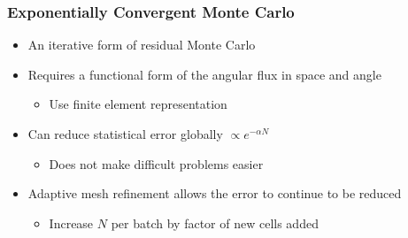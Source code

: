 \documentclass[xcolor=dvipsnames,handout]{beamer}
\newcommand{\colb}[1]{{\color{blue} #1}}
\newlength{\wideitemsep}
\let\olditem\item
\renewcommand{\item}{\setlength{\itemsep}{\wideitemsep}\olditem}
\begin{document}
\begin{frame}
    \frametitle{Exponentially Convergent Monte Carlo}
    \begin{itemize}
        \item An iterative form of residual Monte Carlo
        \item Requires a functional form of the angular flux in space and angle
            \begin{itemize}
                \item Use finite element representation
            \end{itemize}
    \item Can reduce statistical error \colb{globally} $\propto e^{-\alpha N}$
            \begin{itemize}
                \item Does not make difficult problems easier
            \end{itemize}
        \item Adaptive mesh refinement allows the error to continue to be reduced
            \begin{itemize}
                \item Increase $N$ per batch by factor of new cells added
            \end{itemize}
    \end{itemize}


\end{frame}
\end{document}
